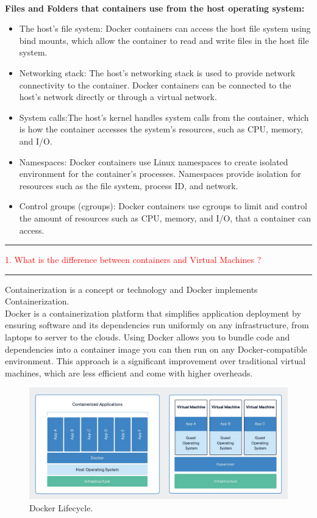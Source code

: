 \documentclass{article}
\begin{document}
\\
\textbf{Files and Folders that containers use from the host operating system:} 
\begin{itemize}
\color{blue}
\item The host's file system: Docker containers can access the host file system using bind mounts, which allow the container to read and write files in the host file system. 
\item Networking stack: The host's networking stack is used to provide network connectivity to the container. Docker containers can be connected to the host's network directly or through a virtual network.
\item System calls:The host's kernel handles system calls from the container, which is how the container accesses the system's resources, such as CPU, memory, and I/O.
\item Namespaces: Docker containers use Linux namespaces to create isolated environment for the container's processes. Namespaces provide isolation for resources such as the file system, process ID, and network. 
\item Control groups (cgroups): Docker containers use cgroups to limit and control the amount of resources such as CPU, memory, and I/O, that a container can access.
\end{itemize}
\noindent
{\color{red} \rule{\linewidth}{0.5mm}}
\textcolor{red}{1. What is the difference between containers and Virtual Machines ?} \\
\noindent
{\color{red} \rule{\linewidth}{0.5mm}}
Containerization is a concept or technology and Docker implements Containerization. \\
\textcolor{PineGreen}{Docker is a containerization platform that simplifies application deployment by ensuring software and its dependencies run uniformly on any infrastructure, from laptops to server to the clouds.}
\textcolor{PineGreen}{Using Docker allows you to bundle code and dependencies into a container image you can then run on any Docker-compatible environment. This approach is a significant improvement over traditional virtual machines, which are less efficient and come with higher overheads.}\\
\begin{figure}
\centering
\includegraphics[width=0.95\linewidth]{DockerVsVMs.png}
\caption{\label{fig:Docker2}Docker Lifecycle.}
\end{figure}
\end{document}
